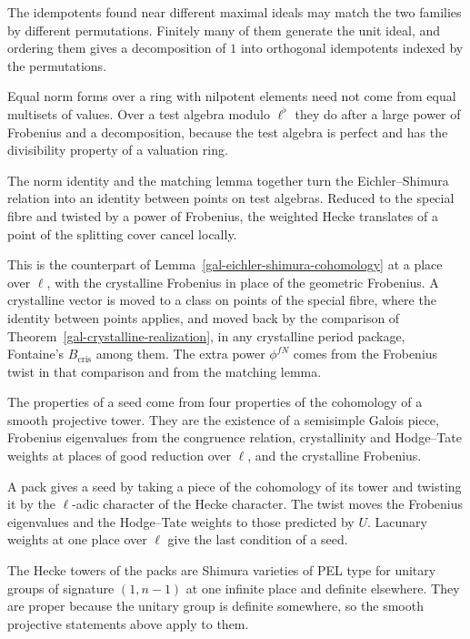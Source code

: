 The idempotents found near different maximal ideals may match the two families by different
permutations. Finitely many of them generate the unit ideal, and ordering them gives a decomposition of
$1$ into orthogonal idempotents indexed by the permutations.

Equal norm forms over a ring with nilpotent elements need not come from equal multisets of values. Over
a test algebra modulo $\ell^\flat$ they do after a large power of Frobenius and a decomposition, because
the test algebra is perfect and has the divisibility property of a valuation ring.

The norm identity and the matching lemma together turn the Eichler--Shimura relation into an identity
between points on test algebras. Reduced to the special fibre and twisted by a power of Frobenius, the
weighted Hecke translates of a point of the splitting cover cancel locally.

This is the counterpart of Lemma~\ref{gal-eichler-shimura-cohomology} at a place over $\ell$, with the
crystalline Frobenius in place of the geometric Frobenius. A crystalline vector is moved to a class on
points of the special fibre, where the identity between points applies, and moved back by the
comparison of Theorem~\ref{gal-crystalline-realization}, in any crystalline period package, Fontaine's
$B_{\mathrm{cris}}$ among them. The extra power $\phi^{fN}$ comes from the Frobenius twist in that comparison
and from the matching lemma.

The properties of a seed come from four properties of the cohomology of a smooth projective tower.
They are the existence of a semisimple Galois piece, Frobenius eigenvalues from the congruence
relation, crystallinity and Hodge--Tate weights at places of good reduction over $\ell$, and the
crystalline Frobenius.

A pack gives a seed by taking a piece of the cohomology of its tower and twisting it by the $\ell$-adic
character of the Hecke character. The twist moves the Frobenius eigenvalues and the Hodge--Tate weights
to those predicted by $U$. Lacunary weights at one place over $\ell$ give the last condition of a
seed.

The Hecke towers of the packs are Shimura varieties of PEL type for unitary groups of signature
$(1,n-1)$ at one infinite place and definite elsewhere. They are proper because the unitary group is
definite somewhere, so the smooth projective statements above apply to them.

